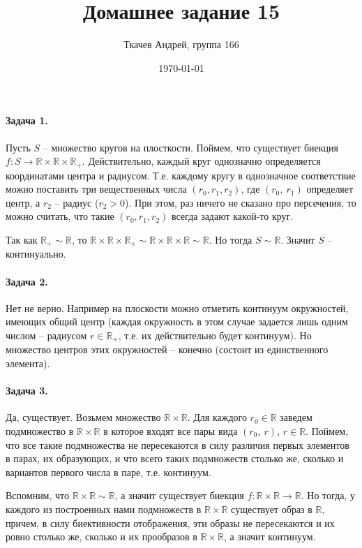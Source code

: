 \documentclass{article}
\title{Домашнее задание 15}
\author{Ткачев Андрей, группа 166}
\date{\today}
\newcommand{\pair}[2]{(#1,\ #2)}
\newcommand{\R}{\mathbb{R}}
\begin{document}
    \maketitle
    \paragraph{Задача 1.}
    Пусть $S$ -- множество кругов на плосткости. Поймем, что существует биекция $f: S \rightarrow \R \times \R \times \R_+$. Действительно, каждый круг однозначно определяется координатами центра и радиусом. Т.е. каждому кругу в однозначное соответствие можно поставить три вещественных числа $(r_0, r_1, r_2)$, где $\pair{r_0}{r_1}$ определяет центр, а $r_2$ -- радиус ($r_2 > 0$). При этом, раз ничего не сказано про персечения, то можно считать, что такие $(r_0, r_1, r_2)$ всегда задают какой-то круг. 

    Так как $\R_+ \sim \R$, то $\R \times \R \times \R_+  \sim \R \times \R \times \R \sim \R$. Но тогда $S \sim \R$. Значит $S$ -- континуально.

    \paragraph{Задача 2.}
    Нет не верно. Например на плоскости можно отметить континуум окружностей, имеющих общий центр (каждая окружность в этом случае задается лишь одним числом -- радиусом $r \in \R_+$, т.е. их действительно будет континуум). Но множество центров этих окружностей -- конечно (состоит из единственного элемента).

    \paragraph{Задача 3.}
    Да, существует. Возьмем множество $\R \times \R$. Для каждого $r_0 \in \R$ заведем подмножество в $\R \times \R$ в которое входят все пары вида $\pair{r_0}{r}$, $r \in \R$. Поймем, что все такие подмножества не пересекаются в силу различия первых элементов в парах, их образующих, и что всего таких подмножеств столько же, сколько и вариантов первого числа в паре, т.е. континуум.

    Вспомним, что $\R \times \R \sim \R$, а значит существует биекция $f: \R \times \R \rightarrow \R$. Но тогда, у каждого из построенных нами подмножеств в $\R \times \R$ существует образ в $\R$, причем, в силу биективности отображения, эти образы не пересекаются и их ровно столько же, сколько и их прообразов в $\R \times \R$, а значит континуум.
\end{document}
